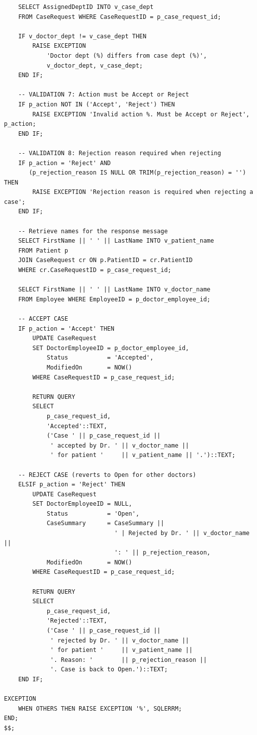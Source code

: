 \documentclass{article}
\begin{document}
\begin{lstlisting}
    SELECT AssignedDeptID INTO v_case_dept
    FROM CaseRequest WHERE CaseRequestID = p_case_request_id;

    IF v_doctor_dept != v_case_dept THEN
        RAISE EXCEPTION
            'Doctor dept (%) differs from case dept (%)',
            v_doctor_dept, v_case_dept;
    END IF;

    -- VALIDATION 7: Action must be Accept or Reject
    IF p_action NOT IN ('Accept', 'Reject') THEN
        RAISE EXCEPTION 'Invalid action %. Must be Accept or Reject', p_action;
    END IF;

    -- VALIDATION 8: Rejection reason required when rejecting
    IF p_action = 'Reject' AND
       (p_rejection_reason IS NULL OR TRIM(p_rejection_reason) = '') THEN
        RAISE EXCEPTION 'Rejection reason is required when rejecting a case';
    END IF;

    -- Retrieve names for the response message
    SELECT FirstName || ' ' || LastName INTO v_patient_name
    FROM Patient p
    JOIN CaseRequest cr ON p.PatientID = cr.PatientID
    WHERE cr.CaseRequestID = p_case_request_id;

    SELECT FirstName || ' ' || LastName INTO v_doctor_name
    FROM Employee WHERE EmployeeID = p_doctor_employee_id;

    -- ACCEPT CASE
    IF p_action = 'Accept' THEN
        UPDATE CaseRequest
        SET DoctorEmployeeID = p_doctor_employee_id,
            Status           = 'Accepted',
            ModifiedOn       = NOW()
        WHERE CaseRequestID = p_case_request_id;

        RETURN QUERY
        SELECT
            p_case_request_id,
            'Accepted'::TEXT,
            ('Case ' || p_case_request_id ||
             ' accepted by Dr. ' || v_doctor_name ||
             ' for patient '     || v_patient_name || '.')::TEXT;

    -- REJECT CASE (reverts to Open for other doctors)
    ELSIF p_action = 'Reject' THEN
        UPDATE CaseRequest
        SET DoctorEmployeeID = NULL,
            Status           = 'Open',
            CaseSummary      = CaseSummary ||
                               ' | Rejected by Dr. ' || v_doctor_name ||
                               ': ' || p_rejection_reason,
            ModifiedOn       = NOW()
        WHERE CaseRequestID = p_case_request_id;

        RETURN QUERY
        SELECT
            p_case_request_id,
            'Rejected'::TEXT,
            ('Case ' || p_case_request_id ||
             ' rejected by Dr. ' || v_doctor_name ||
             ' for patient '     || v_patient_name ||
             '. Reason: '        || p_rejection_reason ||
             '. Case is back to Open.')::TEXT;
    END IF;

EXCEPTION
    WHEN OTHERS THEN RAISE EXCEPTION '%', SQLERRM;
END;
$$;
\end{lstlisting}
\end{document}

